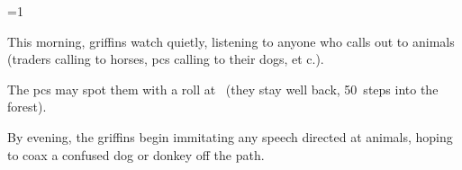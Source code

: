 
\ifnum\value{cycle}=1

  This morning, \glspl{griffin} watch quietly, listening to anyone who calls out to animals (traders calling to horses, \glspl{pc} calling to their dogs, et c.).
  

  The \glspl{pc} may spot them with a  roll
  at \tn\ (they stay well back, 50~\glspl{step} into the forest).

  By evening, the \glspl{griffin} begin immitating any speech directed at animals, hoping to coax a confused dog or donkey off the path.

\fi

